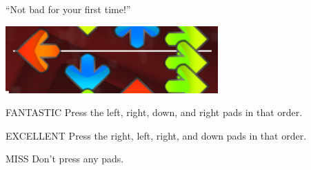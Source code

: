 ``Not bad for your first time!''

\begin{center}
  \includegraphics{itg-lrdr.png}
\end{center}

\begin{switch}
\item{FANTASTIC}
  Press the left, right, down, and right pads in that order.
\item{EXCELLENT}
  Press the right, left, right, and down pads in that order.
\item{MISS}
  Don't press any pads.
\end{switch}



